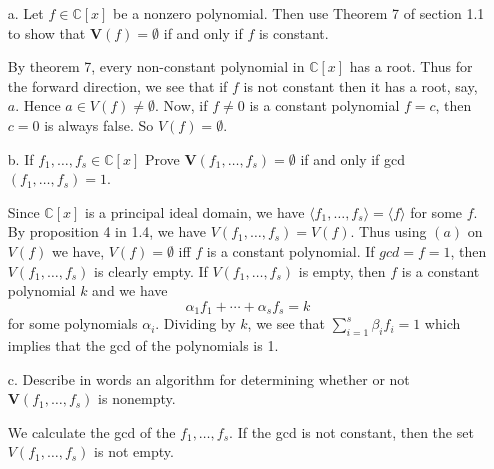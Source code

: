 \documentclass[12pt]{article}
\begin{document}
\begin{enumerate}
    \item[a.] Let $f\in \mathbb{C}[x]$ be a nonzero polynomial. Then use Theorem 7 of section 1.1 to show that $\mathbf{V}(f)=\emptyset$ if and only if $f$ is constant.
    \begin{mybox}
        By theorem 7, every non-constant polynomial in
        $\mathbb{C}[x]$ has a root. Thus for the
        forward direction, we see that if $f$ is not
        constant then it has a root, say, $a$. Hence
        $a\in V(f)\neq \emptyset$.
        Now, if $f\neq 0$ is a constant polynomial $f=c$,
        then $c=0$ is always false. So $V(f)=\emptyset$.
    \end{mybox}
    \item[b.] If $f_1,\ldots, f_s\in \mathbb{C}[x]$ Prove $\mathbf{V}(f_1,\ldots, f_s)=\emptyset$ if and only if gcd$(f_1,\ldots, f_s)=1$.
    \begin{mybox}
        Since $\mathbb{C}[x]$ is a principal ideal domain,
        we have $\langle f_1,\ldots,f_s\rangle=\langle f
        \rangle$ for some $f$. By proposition
        4 in 1.4, we have $V(f_1,\ldots, f_s)=V(f)$. Thus
        using $(a)$ on $V(f)$ we have, $V(f)=\emptyset$
        iff $f$ is a constant polynomial. If $gcd=f=1$,
        then $V(f_1,\ldots,f_s)$ is clearly empty. If
        $V(f_1,\ldots,f_s)$ is empty, then $f$ is a
        constant polynomial $k$ and we have
        $$\alpha_1f_1+\cdots+\alpha_sf_s=k$$
        for some polynomials $\alpha_i$.
        Dividing by $k$, we see that $\sum_{i=1}^{s}{\beta_i
        f_i}=1$ which implies that the gcd of the polynomials
        is 1.

    \end{mybox}
    \item[c.] Describe in words an algorithm for determining whether or not $\mathbf{V}(f_1,\ldots, f_s)$ is nonempty.
    \begin{mybox}
        We calculate the gcd of the $f_1,\ldots,f_s$. If
        the gcd is not constant, then the set $V(f_1,\ldots,
        f_s)$ is not empty.
    \end{mybox}

\end{enumerate}
\end{document}
